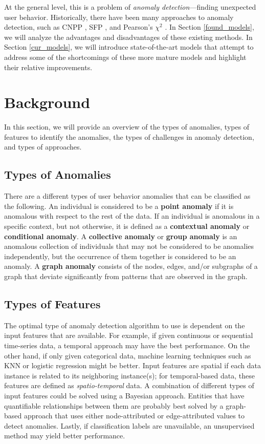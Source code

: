 \documentclass[11pt, oneside]{article}   	%
\begin{document}
\quad At the general level, this is a problem of \textit{anomaly detection}---finding unexpected user behavior.
Historically, there have been many approaches to anomaly detection, such as CNPP \cite{cnpp}, SFP \cite{sfp}, and Pearson's $\chi^2$ \cite{pearson}.
In Section \ref{found_models}, we will analyze the advantages and disadvantages of these existing methods.
In Section \ref{cur_models}, we will introduce state-of-the-art models that attempt to address some of the shortcomings of these more mature models and highlight their relative improvements. 

\section{Background} \label{background}
In this section, we will provide an overview of the types of anomalies, types of features to identify the anomalies, the types of challenges in anomaly detection, and types of approaches. 

\subsection{Types of Anomalies}
\quad There are a different types of user behavior anomalies that can be classified as the following.
An individual is considered to be a \textbf{point anomaly} if it is anomalous with respect to the rest of the data.
If an individual is anomalous in a specific context, but not otherwise, it is defined as a \textbf{contextual anomaly} or \textbf{conditional anomaly}.
A \textbf{collective anomaly} or \textbf{group anomaly} is an anomalous collection of individuals that may not be considered to be anomalies independently, but the occurrence of them together is considered to be an anomaly. \cite{survey1} \cite{survey2}
A \textbf{graph anomaly} consists of the nodes, edges, and/or subgraphs of a graph that deviate significantly from patterns that are observed in the graph. \cite{survey3}

\subsection{Types of Features}
\quad The optimal type of anomaly detection algorithm to use is dependent on the input features that are available.
For example, if given continuous or sequential time-series data, a temporal approach may have the best performance.
On the other hand, if only given categorical data, machine learning techniques such as KNN or logistic regression might be better.
Input features are spatial if each data instance is related to its neighboring instance(s); for temporal-based data, these features are defined as \textit{spatio-temporal} data.
A combination of different types of input features could be solved using a Bayesian approach.
Entities that have quantifiable relationships between them are probably best solved by a graph-based approach that uses either node-attributed or edge-attributed values to detect anomalies.
Lastly, if classification labels are unavailable, an unsupervised method may yield better performance.
\end{document}
